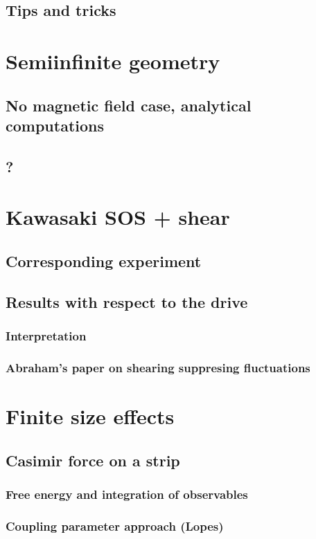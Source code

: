 \documentclass[a4paper,11pt]{report}
\begin{document}
  \section{Tips and tricks}
    
\chapter{Semiinfinite geometry}
  \section{No magnetic field case, analytical computations}
  \section{?}
  
\chapter{Kawasaki SOS + shear}
  \section{Corresponding experiment}
  \section{Results with respect to the drive}
    \subsection{Interpretation}
    \subsection{Abraham's paper on shearing suppresing fluctuations}

\chapter{Finite size effects}
  \section{Casimir force on a strip}
    \subsection{Free energy and integration of observables}
    \subsection{Coupling parameter approach (Lopes)}
\end{document}

